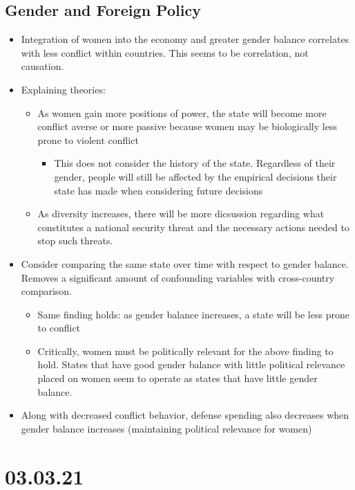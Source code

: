 \documentclass[11pt]{article}
\begin{document}
\subsection*{Gender and Foreign Policy}
\label{sec:orga69917c}
\begin{itemize}
\item Integration of women into the economy and greater gender balance correlates with less conflict within countries. This seems to be correlation, not causation.
\item Explaining theories:
\begin{itemize}
\item As women gain more positions of power, the state will become more conflict averse or more passive because women may be biologically less prone to violent conflict
\begin{itemize}
\item This does not consider the history of the state. Regardless of their gender, people will still be affected by the empirical decisions their state has made when considering future decisions
\end{itemize}
\item As diversity increases, there will be more dicsussion regarding what constitutes a national security threat and the necessary actions needed to stop such threats.
\end{itemize}
\item Consider comparing the same state over time with respect to gender balance. Removes a significant amount of confounding variables with cross-country comparison.
\begin{itemize}
\item Same finding holds: as gender balance increases, a state will be less prone to conflict
\item Critically, women must be politically relevant for the above finding to hold. States that have good gender balance with little political relevance placed on women seem to operate as states that have little gender balance.
\end{itemize}
\item Along with decreased conflict behavior, defense spending also decreases when gender balance increases (maintaining political relevance for women)
\end{itemize}
\section*{03.03.21}
\label{sec:org72fadc7}
\end{document}
